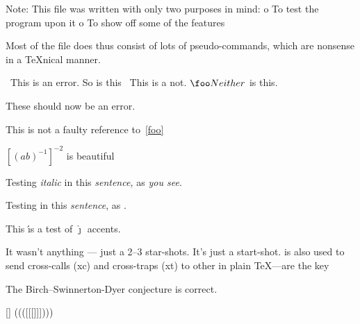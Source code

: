 Note: This file was written with only two purposes in mind:
    o To test the program upon it
    o To show off some of the features

Most of the file does thus consist of lots of pseudo-commands, which
are nonsense in a TeXnical manner.



\foo\ This is an error.
So is this \foo\
\smallskip This is a not. $\foo Neither$ is this.

\startsection[title={Testing ConTeXt}]
These should now be an error.
\stopsection


This is not a faulty reference to~\ref{foo}


${{[{(ab)}^{-1}]}}^{-2}$ is beautiful


Testing {\it italic\/} in this {\em sentence,} as {\em you see}.


Testing \textem{italic} in this \textit{sentence}, as \textem{you see}.


This \'{\i}s a test of $\hat{\jmath}$ accents.


It wasn't anything --- just a 2--3 star-shots.
It's just a start-shot.
is also used to send cross-calls (xc) and cross-traps (xt) to other
in plain TeX---are the key

The Birch--Swinnerton-Dyer conjecture is correct.



{[]} ((([[[{{{}}}]]])))


